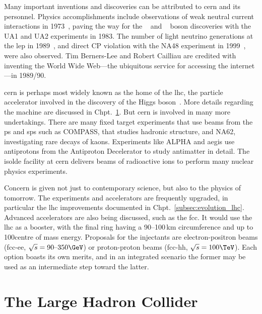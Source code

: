 Many important inventions and discoveries can be attributed to \acrshort{cern} and its personnel. Physics accomplishments include observations of weak neutral current interactions in 1973~\cite{HASERT1973121,HASERT1973138}, paving the way for the \PW~\cite{ARNISON1983103,BANNER1983476} and \PZ~\cite{Arnison:1983mk,Bagnaia:1983zx} boson discoveries with the UA1 and UA2 experiments in 1983. The number of light neutrino generations at the \acrfull{lep} in 1989~\cite{Trentadue:200667}, and direct CP violation with the NA48 experiment in 1999~\cite{Fanti_1999}, were also observed. Tim Berners-Lee and Robert Cailliau are credited with inventing the World Wide Web---the ubiquitous service for accessing the internet---in 1989/90.

\acrshort{cern} is perhaps most widely known as the home of the \acrlong{lhc}, the particle accelerator involved in the discovery of the Higgs boson~\cite{Chatrchyan:2012xdj,Aad:2012tfa}. More details regarding the machine are discussed in Chpt.~\ref{sec:detector_lhc}. But \acrshort{cern} is involved in many more undertakings. There are many fixed target experiments that use beams from the \acrshort{ps} and \acrshort{sps} such as COMPASS, that studies hadronic structure, and NA62, investigating rare decays of kaons. Experiments like ALPHA and \acrshort{aegis} use antiprotons from the Antiproton Decelerator to study antimatter in detail. The \acrshort{isolde} facility at \acrshort{cern} delivers beams of radioactive ions to perform many nuclear physics experiments.

Concern is given not just to contemporary science, but also to the physics of tomorrow. The experiments and accelerators are frequently upgraded, in particular the \acrshort{lhc} improvements documented in Chpt.~\ref{subsec:evolution_lhc}. Advanced accelerators are also being discussed, such as the \acrfull{fcc}. It would use the \acrshort{lhc} as a booster, with the final ring having a 90--100\,km circumference and up to 100\TeV centre of mass energy. Proposals for the injectants are electron-positron beams (\acrshort{fcc}-ee, $\sqrt{s} = \text{90--350}\GeV$) or proton-proton beams (\acrshort{fcc}-hh, $\sqrt{s} = \text{100}\TeV$). Each option boasts its own merits, and in an integrated scenario the former may be used as an intermediate step toward the latter.




\section{The Large Hadron Collider}
\label{sec:detector_lhc}

